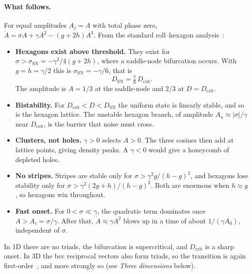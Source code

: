 \documentclass[11pt]{article}
\begin{document}
\paragraph{What follows.} For equal amplitudes $A_j=A$ with total phase zero,
$\dot A = \sigma A + \gamma A^2 - (g+2h)A^3$. From the standard
roll--hexagon analysis~\cite{ciliberto,crossho}:
\begin{itemize}
  \item \textbf{Hexagons exist above threshold.} They exist for
        $\sigma > \sigma_{\mathrm{SN}} = -\gamma^2/4(g+2h)$, where a
        saddle-node bifurcation occurs. With $g=h=\gamma/2$ this is
        $\sigma_{\mathrm{SN}}=-\gamma/6$, that is
        \begin{equation}
          D_{\mathrm{SN}} = \tfrac76\,D_{\mathrm{crit}} .
        \end{equation}
        The amplitude is $A=1/3$ at the saddle-node and $2/3$ at
        $D=D_{\mathrm{crit}}$.
  \item \textbf{Bistability.} For $D_{\mathrm{crit}}<D<D_{\mathrm{SN}}$ the
        uniform state is linearly stable, and so is the hexagon lattice. The
        unstable hexagon branch, of amplitude $A_u\approx|\sigma|/\gamma$ near
        $D_{\mathrm{crit}}$, is the barrier that noise must cross.
  \item \textbf{Clusters, not holes.} $\gamma>0$ selects $A>0$. The three
        cosines then add at lattice points, giving density peaks. A
        $\gamma<0$ would give a honeycomb of depleted holes.
  \item \textbf{No stripes.} Stripes are stable only for
        $\sigma>\gamma^2g/(h-g)^2$, and hexagons lose stability only for
        $\sigma>\gamma^2(2g+h)/(h-g)^2$. Both are enormous when $h\approx g$,
        so hexagons win throughout.
  \item \textbf{Fast onset.} For $0<\sigma\ll\gamma$, the quadratic term
        dominates once $A>A_c=\sigma/\gamma$. After that,
        $\dot A\approx\gamma A^2$ blows up in a time of about $1/(\gamma A_0)$,
        independent of $\sigma$.
\end{itemize}
In 1D there are no triads, the bifurcation is supercritical, and
$D_{\mathrm{crit}}$ is a sharp onset. In 3D the bcc reciprocal vectors also
form triads, so the transition is again first-order~\cite{alexander}, and more
strongly so (see \emph{Three dimensions} below).
\end{document}
